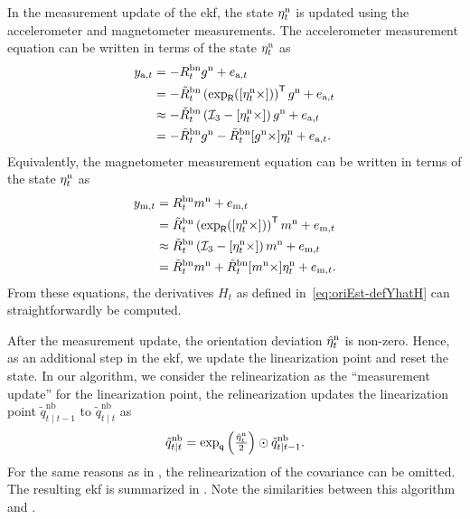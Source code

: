In the measurement update of the \gls{ekf}, the state $\eta^\text{n}_t$ is updated using the accelerometer and magnetometer measurements. The accelerometer measurement equation can be written in terms of the state $\eta^\text{n}_t$ as
\begin{align}
y_{\text{a},t} &= - R^\text{bn}_t g^\text{n} + e_{\text{a},t} \nonumber \\
&= - \tilde{R}^\text{bn}_t \left( \exp_\mathsf{R}([\eta_t^\text{n} \times]) \right)^{\mathsf{T}} g^\text{n} + e_{\text{a},t} \nonumber \\
&\approx - \tilde{R}^\text{bn}_t \left( \mathcal{I}_3 - [ \eta^\text{n}_t \times] \right) g^\text{n} + e_{\text{a},t} \nonumber \\
&= - \tilde{R}^\text{bn}_t g^\text{n} - \tilde{R}^\text{bn}_t [g^\text{n} \times] \eta^\text{n}_t + e_{\text{a},t}.
\end{align}
Equivalently, the magnetometer measurement equation can be written in terms of the state $\eta_t^\text{n}$ as
\begin{align}
y_{\text{m},t} &= R^\text{bn}_t m^\text{n} + e_{\text{m},t} \nonumber \\
&= \tilde{R}^\text{bn}_t \left( \exp_\mathsf{R}([\eta_t^\text{n} \times]) \right)^{\mathsf{T}} m^\text{n} + e_{\text{m},t} \nonumber \\
&\approx \tilde{R}^\text{bn}_t \left( \mathcal{I}_3 - [\eta_t^\text{n} \times] \right) m^\text{n} + e_{\text{m},t} \nonumber \\
&= \tilde{R}^\text{bn}_t m^\text{n} + \tilde{R}_t^\text{bn} [m^\text{n} \times] \eta_t^\text{n} + e_{\text{m},t}.
\end{align}
From these equations, the derivatives $H_t$ as defined in~\eqref{eq:oriEst-defYhatH} can straightforwardly be computed. 

After the measurement update, the orientation deviation $\hat{\eta}^\text{n}_t$ is non-zero. Hence, as an additional step in the \gls{ekf}, we update the linearization point and reset the state. In our algorithm, we consider the relinearization as the ``measurement update'' for the linearization point, \ie the relinearization updates the linearization point $\tilde{q}^\text{nb}_{t \mid t-1}$ to $\tilde{q}^\text{nb}_{t \mid t}$ as
\begin{align}
\tilde{q}^\text{nb}_{t \mid t} = \exp_\mathsf{q} \left( \tfrac{\hat{\eta}^\text{n}_t}{2} \right) \odot \tilde{q}^\text{nb}_{t \mid t-1}.
\end{align}
For the same reasons as in , the relinearization of the covariance can be omitted. The resulting \gls{ekf} is summarized in . Note the similarities between this algorithm and .

